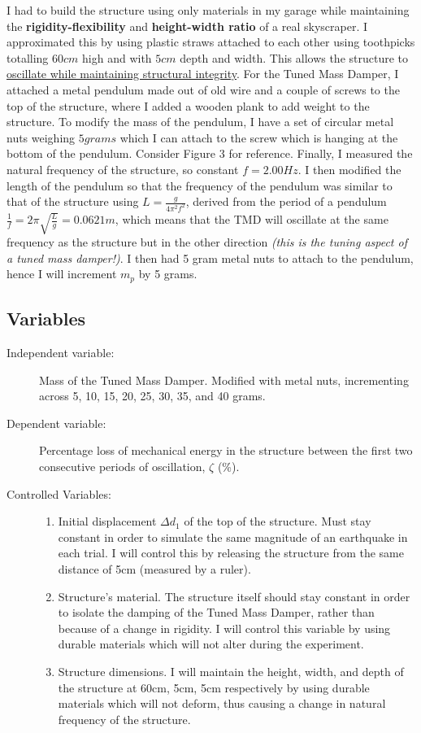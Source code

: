 \documentclass{article}
\begin{document}
I had to build the structure using only materials in my garage while maintaining the\textbf{ rigidity-flexibility} and\textbf{ height-width ratio} of a real skyscraper. I approximated this by using plastic straws attached to each other using toothpicks totalling $60cm$ high and with $5cm$ depth and width. This allows the structure to \underline{oscillate while maintaining structural integrity}. For the Tuned Mass Damper, I attached a metal pendulum made out of old wire and a couple of screws to the top of the structure, where I added a wooden plank to add weight to the structure. To modify the mass of the pendulum, I have a set of circular metal nuts weighing $5 grams$ which I can attach to the screw which is hanging at the bottom of the pendulum. Consider Figure 3 for reference. Finally, I measured the natural frequency of the structure, so constant $f=2.00Hz$. I then modified the length of the pendulum so that the frequency of the pendulum was similar to that of the structure using $L=\frac{g}{4\pi^2f^2}$, derived from the period of a pendulum $\frac{1}{f}=2\pi\sqrt{\frac{L}{g}}=0.0621m$, which means that the TMD will oscillate at the same frequency as the structure but in the other direction \textit{(this is the tuning aspect of a tuned mass damper!)}. I then had 5 gram metal nuts to attach to the pendulum, hence I will increment $m_p$ by 5 grams. 

\subsection{Variables} 

\begin{description}
    \item[Independent variable: ] Mass of the Tuned Mass Damper. Modified with metal nuts, incrementing across 5, 10, 15, 20, 25, 30, 35, and 40 grams.
    \item[Dependent variable: ] Percentage loss of mechanical energy in the structure between the first two consecutive periods of oscillation, $\zeta$ (\%).
    \item[Controlled Variables: ] \phantom{.}
    \begin{enumerate}
        \item Initial displacement $\Delta d_1$ of the top of the structure. Must stay constant in order to simulate the same magnitude of an earthquake in each trial. I will control this by releasing the structure from the same distance of 5cm (measured by a ruler).
        \item Structure’s material. The structure itself should stay constant in order to isolate the damping of the Tuned Mass Damper, rather than because of a change in rigidity. I will control this variable by using durable materials which will not alter during the experiment. 
        \item Structure dimensions. I will maintain the height, width, and depth of the structure at 60cm, 5cm, 5cm respectively by using durable materials which will not deform, thus causing a change in natural frequency of the structure. 
    \end{enumerate}
\end{description}
\end{document}
